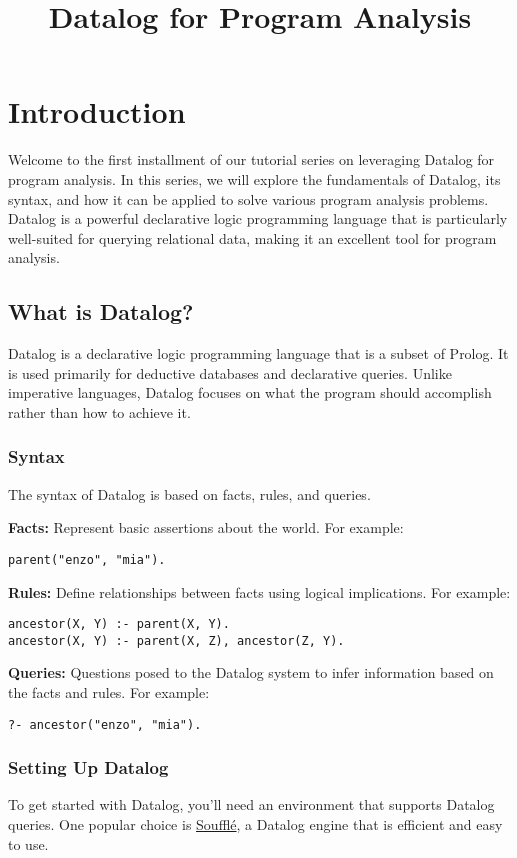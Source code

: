 \documentclass{article}
\theoremstyle{definition}
\begin{document}
\title{Datalog for Program Analysis}

\section{Introduction}
Welcome to the first installment of our tutorial series on leveraging Datalog for program analysis. In this series, we will explore the fundamentals of Datalog, its syntax, and how it can be applied to solve various program analysis problems. Datalog is a powerful declarative logic programming language that is particularly well-suited for querying relational data, making it an excellent tool for program analysis.

\subsection{What is Datalog?}
Datalog is a declarative logic programming language that is a subset of Prolog. It is used primarily for deductive databases and declarative queries. Unlike imperative languages, Datalog focuses on what the program should accomplish rather than how to achieve it.

\subsubsection{Syntax}
The syntax of Datalog is based on facts, rules, and queries.

\textbf{Facts:} Represent basic assertions about the world. For example:
\begin{verbatim}
parent("enzo", "mia").
\end{verbatim}

\textbf{Rules:} Define relationships between facts using logical implications. For example:
\begin{verbatim}
ancestor(X, Y) :- parent(X, Y).
ancestor(X, Y) :- parent(X, Z), ancestor(Z, Y).
\end{verbatim}

\textbf{Queries:} Questions posed to the Datalog system to infer information based on the facts and rules. For example:
\begin{verbatim}
?- ancestor("enzo", "mia").
\end{verbatim}

\subsubsection{Setting Up Datalog}
To get started with Datalog, you'll need an environment that supports Datalog queries. One popular choice is \href{https://souffle-lang.github.io/}{Soufflé}, a Datalog engine that is efficient and easy to use.
\end{document}
